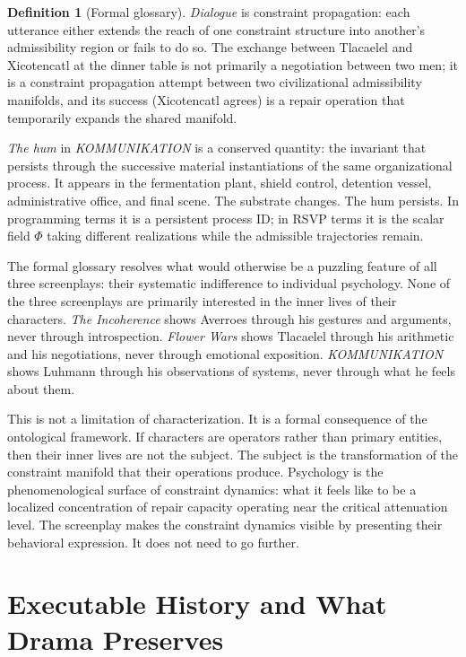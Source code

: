 \documentclass[11pt, a4paper]{article}
\theoremstyle{definition}
\newtheorem{definition}{Definition}
\theoremstyle{remark}
\begin{document}
\begin{definition}[Formal glossary]
\textit{Dialogue} is constraint propagation: each utterance either extends
the reach of one constraint structure into another's admissibility region
or fails to do so. The exchange between Tlacaelel and Xicotencatl at the
dinner table is not primarily a negotiation between two men; it is a
constraint propagation attempt between two civilizational admissibility
manifolds, and its success (Xicotencatl agrees) is a repair operation that
temporarily expands the shared manifold.

\textit{The hum} in \textit{KOMMUNIKATION} is a conserved quantity: the
invariant that persists through the successive material instantiations of
the same organizational process. It appears in the fermentation plant,
shield control, detention vessel, administrative office, and final scene.
The substrate changes. The hum persists. In programming terms it is a
persistent process ID; in RSVP terms it is the scalar field $\Phi$ taking
different realizations while the admissible trajectories remain.
\end{definition}

The formal glossary resolves what would otherwise be a puzzling feature of
all three screenplays: their systematic indifference to individual psychology.
None of the three screenplays are primarily interested in the inner lives of
their characters. \textit{The Incoherence} shows Averroes through his
gestures and arguments, never through introspection. \textit{Flower Wars}
shows Tlacaelel through his arithmetic and his negotiations, never through
emotional exposition. \textit{KOMMUNIKATION} shows Luhmann through his
observations of systems, never through what he feels about them.

This is not a limitation of characterization. It is a formal consequence of
the ontological framework. If characters are operators rather than primary
entities, then their inner lives are not the subject. The subject is the
transformation of the constraint manifold that their operations produce.
Psychology is the phenomenological surface of constraint dynamics: what it
feels like to be a localized concentration of repair capacity operating near
the critical attenuation level. The screenplay makes the constraint dynamics
visible by presenting their behavioral expression. It does not need to go
further.

\section{Executable History and What Drama Preserves}
\end{document}
